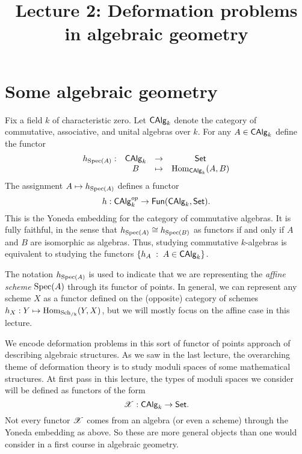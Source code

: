 \documentclass[11pt]{amsart}
\title{Lecture 2: Deformation problems in algebraic geometry}
\def\Spec{{\rm Spec}}
\begin{document}
\maketitle

\section{Some algebraic geometry}

Fix a field $k$ of characteristic zero.
Let ${\sf CAlg}_k$ denote the category of commutative, associative, and unital algebras over $k$.
For any $A \in {\sf CAlg}_k$ define the functor
\[
\begin{array}{cccc}
h_{{\rm Spec}(A)} : & {\sf CAlg}_k & \to & {\sf Set} \\
& B & \mapsto & {\rm Hom}_{{\sf CAlg}_k}(A,B) 
\end{array}
\]
The assignment $A \mapsto h_{{\rm Spec}(A)}$ defines a functor
\[
h : {\sf CAlg}^{op}_k \to {\sf Fun}({\sf CAlg}_k , {\sf Set}) .
\]
This is the Yoneda embedding for the category of commutative algebras. 
It is fully faithful, in the sense that $h_{\Spec(A)} \cong h_{\Spec(B)}$ as functors if and only if $A$ and $B$ are isomorphic as algebras. 
Thus, studying commutative $k$-algebras is equivalent to studying the functors $\{h_A \; : \; A \in {\sf CAlg}_k\}$. 

\begin{rmk}
The notation $h_{{\rm Spec}(A)}$ is used to indicate that we are representing the {\em affine scheme} ${\rm Spec}(A)$ through its functor of points. 
In general, we can represent any scheme $X$ as a functor defined on the (opposite) category of schemes $h_X : Y \mapsto {\rm Hom}_{\rm Sch_{/k}} (Y, X)$, but we will mostly focus on the affine case in this lecture.
\end{rmk}

We encode deformation problems in this sort of functor of points approach of describing algebraic structures. 
As we saw in the last lecture, the overarching theme of deformation theory is to study moduli spaces of some mathematical structures. 
At first pass in this lecture, the types of moduli spaces we consider will be defined as functors of the form
\[
\mathscr X : {\sf CAlg}_k \to {\sf Set} .
\]
Not every functor $\mathscr X$ comes from an algebra (or even a scheme) through the Yoneda embedding as above.
So these are more general objects than one would consider in a first course in algebraic geometry. 
\end{document}
